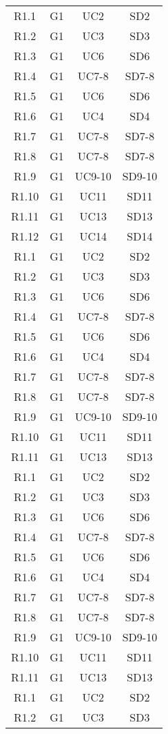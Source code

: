 \begin{longtable}{cccc}
    R1.1 & G1 & UC2    & SD2  \\
    R1.2 & G1 & UC3    & SD3  \\
    R1.3 & G1 & UC6    & SD6  \\
    R1.4 & G1 & UC7-8  & SD7-8 \\
    R1.5 & G1 & UC6    & SD6  \\
    R1.6 & G1 & UC4    & SD4  \\
    R1.7 & G1 & UC7-8  & SD7-8 \\
    R1.8 & G1 & UC7-8  & SD7-8 \\
    R1.9 & G1 & UC9-10 & SD9-10 \\
    R1.10 & G1 & UC11  & SD11 \\
    R1.11 & G1 & UC13  & SD13 \\
    R1.12 & G1 & UC14  & SD14 \\
    R1.1 & G1 & UC2    & SD2  \\
    R1.2 & G1 & UC3    & SD3  \\
    R1.3 & G1 & UC6    & SD6  \\
    R1.4 & G1 & UC7-8  & SD7-8 \\
    R1.5 & G1 & UC6    & SD6  \\
    R1.6 & G1 & UC4    & SD4  \\
    R1.7 & G1 & UC7-8  & SD7-8 \\
    R1.8 & G1 & UC7-8  & SD7-8 \\
    R1.9 & G1 & UC9-10 & SD9-10 \\
    R1.10 & G1 & UC11  & SD11 \\
    R1.11 & G1 & UC13  & SD13 \\
    R1.1 & G1 & UC2    & SD2  \\
    R1.2 & G1 & UC3    & SD3  \\
    R1.3 & G1 & UC6    & SD6  \\
    R1.4 & G1 & UC7-8  & SD7-8 \\
    R1.5 & G1 & UC6    & SD6  \\
    R1.6 & G1 & UC4    & SD4  \\
    R1.7 & G1 & UC7-8  & SD7-8 \\
    R1.8 & G1 & UC7-8  & SD7-8 \\
    R1.9 & G1 & UC9-10 & SD9-10 \\
    R1.10 & G1 & UC11  & SD11 \\
    R1.11 & G1 & UC13  & SD13 \\
    R1.1 & G1 & UC2    & SD2  \\
    R1.2 & G1 & UC3    & SD3  \\

\end{longtable}
